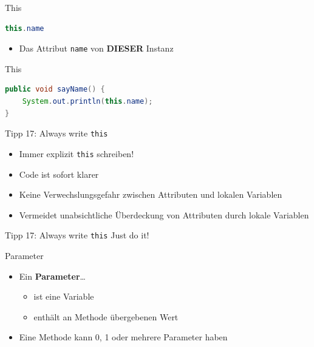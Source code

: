 \documentclass[18pt]{beamer}
\begin{document}
\begin{frame}[fragile]{This}
    \begin{exampleblock}{}
        \begin{lstlisting}[language=Java,basicstyle=\Huge]
this.name
        \end{lstlisting}
    \end{exampleblock}
    \begin{itemize}
        \item Das Attribut \texttt{name} von \textbf{DIESER} Instanz
    \end{itemize}
\end{frame}


\begin{frame}[fragile]{This}
    \begin{exampleblock}{}
        \begin{lstlisting}[language=Java]
public void sayName() {
    System.out.println(this.name);
}
        \end{lstlisting}
    \end{exampleblock}
\end{frame}

\begin{frame}{Tipp 17: Always write \texttt{this}}
    \begin{itemize}
        \item Immer explizit \texttt{this} schreiben!
        \item Code ist sofort klarer
        \item Keine Verwechslungsgefahr zwischen Attributen und lokalen Variablen
        \item Vermeidet unabsichtliche Überdeckung von Attributen durch lokale Variablen
    \end{itemize}
\end{frame}

\begin{frame}{Tipp 17: Always write \texttt{this}}
    \center
    \Huge{Just do it!}
\end{frame}

\begin{frame}{Parameter}
    \begin{itemize}
        \item Ein \textbf{Parameter}\dots
        \begin{itemize}
            \item ist eine Variable
            \item enthält an Methode übergebenen Wert
        \end{itemize}
        \vspace{.2in}
        \item Eine Methode kann 0, 1 oder mehrere Parameter haben
    \end{itemize}
\end{frame}
\end{document}
